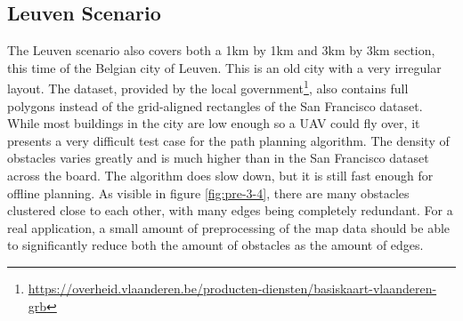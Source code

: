 \subsection{Leuven Scenario}
The Leuven scenario also covers both a 1km by 1km and 3km by 3km section, this time of the Belgian city of Leuven. This is an old city with a very irregular layout. The dataset, provided by the local government\footnote{\url{https://overheid.vlaanderen.be/producten-diensten/basiskaart-vlaanderen-grb}}, also contains full polygons instead of the grid-aligned rectangles of the San Francisco dataset. While most buildings in the city are low enough so a UAV could fly over, it presents a very difficult test case for the path planning algorithm. The density of obstacles varies greatly and is much higher than in the San Francisco dataset across the board. The algorithm does slow down, but it is still fast enough for offline planning. As visible in figure \ref{fig:pre-3-4}, there are many obstacles clustered close to each other, with many edges being completely redundant. For a real application, a small amount of preprocessing of the map data should be able to significantly reduce both the amount of obstacles as the amount of edges. 

